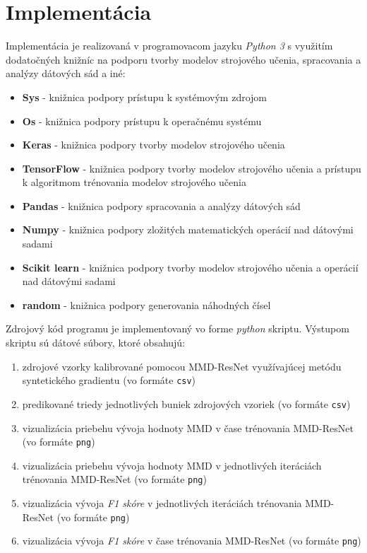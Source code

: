 \chapter{Implementácia}  %
\label{implementacia}

Implementácia je realizovaná v programovacom jazyku \textit{Python 3} s využitím dodatočných knižníc na podporu tvorby modelov strojového učenia, spracovania a analýzy dátových sád a iné:
\begin{itemize}
    \item \textbf{Sys} - knižnica podpory prístupu k systémovým zdrojom
    \item \textbf{Os} -  knižnica podpory prístupu k operačnému systému
    \item \textbf{Keras} - knižnica podpory tvorby modelov strojového učenia
    \item \textbf{TensorFlow} - knižnica podpory tvorby modelov strojového učenia a prístupu k algoritmom trénovania modelov strojového učenia
    \item \textbf{Pandas} - knižnica podpory spracovania a analýzy dátových sád
    \item \textbf{Numpy} - knižnica podpory zložitých matematických operácií nad dátovými sadami
    \item \textbf{Scikit learn} - knižnica podpory tvorby modelov strojového učenia a operácií nad dátovými sadami
    \item \textbf{random} - knižnica podpory generovania náhodných čísel
\end{itemize}

Zdrojový kód programu je implementovaný vo forme \textit{python} skriptu. Výstupom skriptu sú dátové súbory, ktoré obsahujú:
\begin{enumerate}
    \item zdrojové vzorky kalibrované pomocou MMD-ResNet využívajúcej metódu syntetického gradientu (vo formáte \texttt{csv})
    \item predikované triedy jednotlivých buniek zdrojových vzoriek (vo formáte \texttt{csv})
    \item vizualizácia priebehu vývoja hodnoty MMD v čase trénovania MMD-ResNet (vo formáte \texttt{png})
    \item vizualizácia priebehu vývoja hodnoty MMD v jednotlivých iteráciách trénovania MMD-ResNet (vo formáte \texttt{png})
    \item vizualizácia vývoja \textit{F1 skóre} v jednotlivých iteráciách trénovania MMD-ResNet (vo formáte \texttt{png})
    \item vizualizácia vývoja \textit{F1 skóre} v čase trénovania MMD-ResNet (vo formáte \texttt{png})
\end{enumerate}

